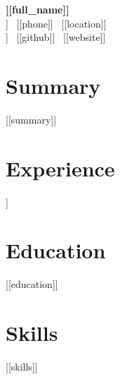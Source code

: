 \documentclass[11pt]{article}
\begin{document}
\begin{center}
{\Large \textbf{[[full_name]]}}\\
[[email]] \textbullet\ [[phone]] \textbullet\ [[location]]\\
[[linkedin]] \textbullet\ [[github]] \textbullet\ [[website]]
\end{center}

\section*{Summary}
[[summary]]

\section*{Experience}
\begin{itemize}[leftmargin=*]
[[experience]]
\end{itemize}

\section*{Education}
[[education]]

\section*{Skills}
[[skills]]
\end{document}
